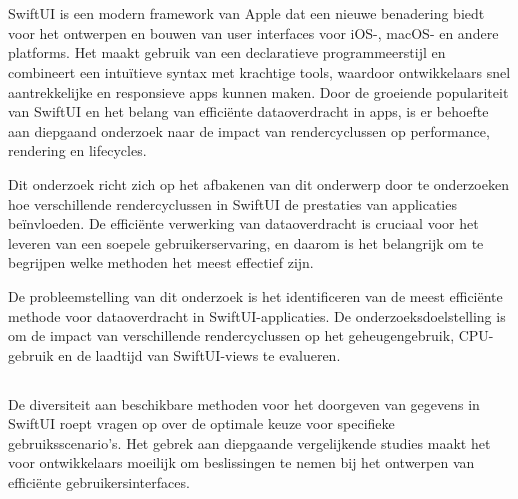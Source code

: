 
\chapter{}%
\label{ch:inleiding}

SwiftUI is een modern framework van Apple dat een nieuwe benadering biedt voor het ontwerpen en bouwen van user interfaces voor iOS-, macOS- en andere platforms. Het maakt gebruik van een declaratieve programmeerstijl en combineert een intuïtieve syntax met krachtige tools, waardoor ontwikkelaars snel aantrekkelijke en responsieve apps kunnen maken. Door de groeiende populariteit van SwiftUI en het belang van efficiënte dataoverdracht in apps, is er behoefte aan diepgaand onderzoek naar de impact van rendercyclussen op performance, rendering en lifecycles.

Dit onderzoek richt zich op het afbakenen van dit onderwerp door te onderzoeken hoe verschillende rendercyclussen in SwiftUI de prestaties van applicaties beïnvloeden. De efficiënte verwerking van dataoverdracht is cruciaal voor het leveren van een soepele gebruikerservaring, en daarom is het belangrijk om te begrijpen welke methoden het meest effectief zijn.

De probleemstelling van dit onderzoek is het identificeren van de meest efficiënte methode voor dataoverdracht in SwiftUI-applicaties. De onderzoeksdoelstelling is om de impact van verschillende rendercyclussen op het geheugengebruik, CPU-gebruik en de laadtijd van SwiftUI-views te evalueren.

\section{}%
\label{sec:probleemstelling}

%
De diversiteit aan beschikbare methoden voor
het doorgeven van gegevens in SwiftUI roept vragen
op over de optimale keuze voor specifieke gebruiksscenario’s.
Het gebrek aan diepgaande vergelijkende
studies maakt het voor ontwikkelaars
moeilijk om beslissingen te nemen bij het ontwerpen
van efficiënte gebruikersinterfaces.


